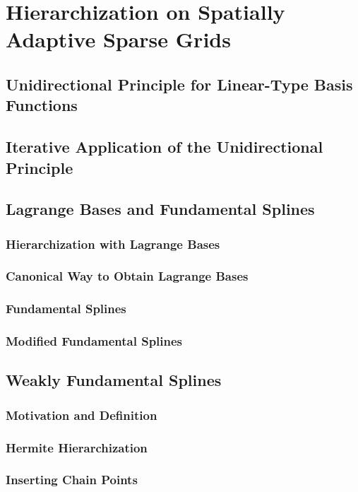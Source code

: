\section{Hierarchization on Spatially Adaptive Sparse Grids}

\blindtext{}

\subsection{Unidirectional Principle for Linear-Type Basis Functions}

\blindtext{}

\subsection{Iterative Application of the Unidirectional Principle}

\blindtext{}

\subsection{Lagrange Bases and Fundamental Splines}

\blindtext{}

\subsubsection{Hierarchization with Lagrange Bases}

\blindtext{}

\subsubsection{Canonical Way to Obtain Lagrange Bases}

\blindtext{}

\subsubsection{Fundamental Splines}

\blindtext{}

\subsubsection{Modified Fundamental Splines}

\blindtext{}

\subsection{Weakly Fundamental Splines}

\blindtext{}

\subsubsection{Motivation and Definition}

\blindtext{}

\subsubsection{Hermite Hierarchization}

\blindtext{}

\subsubsection{Inserting Chain Points}

\blindtext{}
